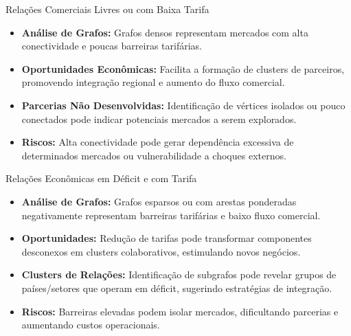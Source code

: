 \begin{frame}{Relações Comerciais Livres ou com Baixa Tarifa}
  \begin{itemize}
    \item \textbf{Análise de Grafos:} Grafos densos representam mercados com alta conectividade e poucas barreiras tarifárias.
    \item \textbf{Oportunidades Econômicas:} Facilita a formação de clusters de parceiros, promovendo integração regional e aumento do fluxo comercial.
    \item \textbf{Parcerias Não Desenvolvidas:} Identificação de vértices isolados ou pouco conectados pode indicar potenciais mercados a serem explorados.
    \item \textbf{Riscos:} Alta conectividade pode gerar dependência excessiva de determinados mercados ou vulnerabilidade a choques externos.
  \end{itemize}
\end{frame}

\begin{frame}{Relações Econômicas em Déficit e com Tarifa}
  \begin{itemize}
    \item \textbf{Análise de Grafos:} Grafos esparsos ou com arestas ponderadas negativamente representam barreiras tarifárias e baixo fluxo comercial.
    \item \textbf{Oportunidades:} Redução de tarifas pode transformar componentes desconexos em clusters colaborativos, estimulando novos negócios.
    \item \textbf{Clusters de Relações:} Identificação de subgrafos pode revelar grupos de países/setores que operam em déficit, sugerindo estratégias de integração.
    \item \textbf{Riscos:} Barreiras elevadas podem isolar mercados, dificultando parcerias e aumentando custos operacionais.
  \end{itemize}
\end{frame}

